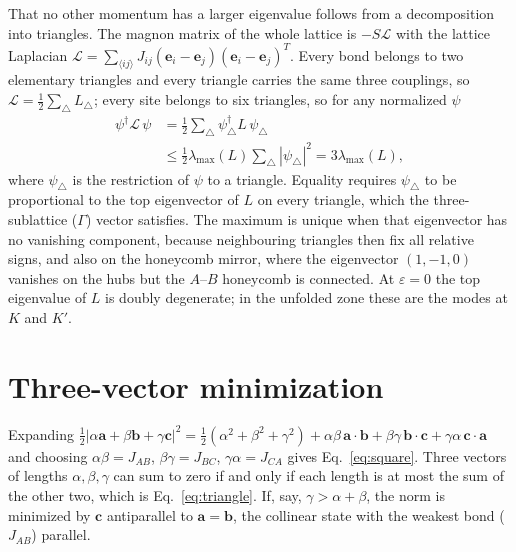 \documentclass[prb,twocolumn,superscriptaddress,amsmath,amssymb,floatfix]{revtex4-2}
\begin{document}
That no other momentum has a larger eigenvalue follows from a decomposition into triangles. The magnon matrix of the whole lattice is $-S\mathcal L$ with the lattice Laplacian $\mathcal L=\sum_{\langle ij\rangle}J_{ij}(\mathbf e_i-\mathbf e_j)(\mathbf e_i-\mathbf e_j)^{T}$. Every bond belongs to two elementary triangles and every triangle carries the same three couplings, so $\mathcal L=\tfrac12\sum_\triangle L_\triangle$; every site belongs to six triangles, so for any normalized $\psi$
\begin{align}
\psi^\dagger\mathcal L\,\psi&=\tfrac12\sum_\triangle\psi_\triangle^\dagger L\,\psi_\triangle\nonumber\\
&\le\tfrac12\lambda_{\max}(L)\sum_\triangle|\psi_\triangle|^2=3\lambda_{\max}(L),
\end{align}
where $\psi_\triangle$ is the restriction of $\psi$ to a triangle. Equality requires $\psi_\triangle$ to be proportional to the top eigenvector of $L$ on every triangle, which the three-sublattice ($\Gamma$) vector satisfies. The maximum is unique when that eigenvector has no vanishing component, because neighbouring triangles then fix all relative signs, and also on the honeycomb mirror, where the eigenvector $(1,-1,0)$ vanishes on the hubs but the $A$--$B$ honeycomb is connected. At $\varepsilon=0$ the top eigenvalue of $L$ is doubly degenerate; in the unfolded zone these are the modes at $K$ and $K'$.

\section{Three-vector minimization}
\label{app:three}
Expanding $\tfrac12|\alpha\mathbf a+\beta\mathbf b+\gamma\mathbf c|^2=\tfrac12(\alpha^2+\beta^2+\gamma^2)+\alpha\beta\,\mathbf a\cdot\mathbf b+\beta\gamma\,\mathbf b\cdot\mathbf c+\gamma\alpha\,\mathbf c\cdot\mathbf a$ and choosing $\alpha\beta=J_{AB}$, $\beta\gamma=J_{BC}$, $\gamma\alpha=J_{CA}$ gives Eq.~\eqref{eq:square}. Three vectors of lengths $\alpha,\beta,\gamma$ can sum to zero if and only if each length is at most the sum of the other two, which is Eq.~\eqref{eq:triangle}. If, say, $\gamma>\alpha+\beta$, the norm is minimized by $\mathbf c$ antiparallel to $\mathbf a=\mathbf b$, the collinear state with the weakest bond ($J_{AB}$) parallel.
\end{document}
